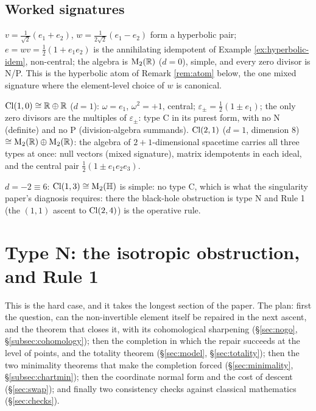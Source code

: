 \subsection{Worked signatures}

\begin{example}\label{ex:cl11}
$v = \tfrac{1}{\sqrt2}(e_1 + e_2)$, $w = \tfrac{1}{2\sqrt2}(e_1 - e_2)$ form a hyperbolic pair; $e = wv = \tfrac12(1 + e_1e_2)$ is the annihilating idempotent of Example \ref{ex:hyperbolic-idem}, non-central; the algebra is $\mathrm{M}_2(\mathbb{R})$ ($d = 0$), simple, and every zero divisor is N/P. This is the hyperbolic atom of Remark \ref{rem:atom} below, the one mixed signature where the element-level choice of $w$ is canonical.
\end{example}

\begin{example}\label{ex:cl10}
$\mathrm{Cl}(1,0) \cong \mathbb{R} \oplus \mathbb{R}$ ($d = 1$): $\omega = e_1$, $\omega^2 = +1$, central; $\varepsilon_\pm = \tfrac12(1 \pm e_1)$; the only zero divisors are the multiples of $\varepsilon_\pm$: type C in its purest form, with no N (definite) and no P (division-algebra summands). $\mathrm{Cl}(2,1)$ ($d = 1$, dimension 8) $\cong \mathrm{M}_2(\mathbb{R}) \oplus \mathrm{M}_2(\mathbb{R})$: the algebra of $2{+}1$-dimensional spacetime carries all three types at once: null vectors (mixed signature), matrix idempotents in each ideal, and the central pair $\tfrac12(1 \pm e_1e_2e_3)$.
\end{example}

\begin{example}\label{ex:cl13}
$d = -2 \equiv 6$: $\mathrm{Cl}(1,3) \cong \mathrm{M}_2(\mathbb{H})$ is simple: no type C, which is what the singularity paper's diagnosis requires: there the black-hole obstruction is type N and Rule 1 (the $(1,1)$ ascent to $\mathrm{Cl}(2,4)$) is the operative rule.
\end{example}

\section{Type N: the isotropic obstruction, and Rule 1}\label{sec:typeN}

This is the hard case, and it takes the longest section of the paper. The plan: first the question, can the non-invertible element itself be repaired in the next ascent, and the theorem that closes it, with its cohomological sharpening (\S\ref{sec:nogo}, \S\ref{subsec:cohomology}); then the completion in which the repair succeeds at the level of points, and the totality theorem (\S\ref{sec:model}, \S\ref{sec:totality}); then the two minimality theorems that make the completion forced (\S\ref{sec:minimality}, \S\ref{subsec:chartmin}); then the coordinate normal form and the cost of descent (\S\ref{sec:swap}); and finally two consistency checks against classical mathematics (\S\ref{sec:checks}).

